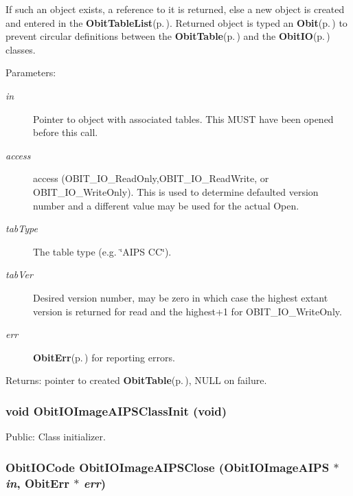 If such an object exists, a reference to it is returned, else a new object is created and entered in the {\bf Obit\-Table\-List}{\rm (p.\,\pageref{structObitTableList})}. Returned object is typed an {\bf Obit}{\rm (p.\,\pageref{structObit})} to prevent circular definitions between the {\bf Obit\-Table}{\rm (p.\,\pageref{structObitTable})} and the {\bf Obit\-IO}{\rm (p.\,\pageref{structObitIO})} classes. \begin{Desc}
\item[Parameters:]
\begin{description}
\item[{\em in}]Pointer to object with associated tables. This MUST have been opened before this call. \item[{\em access}]access (OBIT\_\-IO\_\-Read\-Only,OBIT\_\-IO\_\-Read\-Write, or OBIT\_\-IO\_\-Write\-Only). This is used to determine defaulted version number and a different value may be used for the actual Open. \item[{\em tab\-Type}]The table type (e.g. \char`\"{}AIPS CC\char`\"{}). \item[{\em tab\-Ver}]Desired version number, may be zero in which case the highest extant version is returned for read and the highest+1 for OBIT\_\-IO\_\-Write\-Only. \item[{\em err}]{\bf Obit\-Err}{\rm (p.\,\pageref{structObitErr})} for reporting errors. \end{description}
\end{Desc}
\begin{Desc}
\item[Returns:]pointer to created {\bf Obit\-Table}{\rm (p.\,\pageref{structObitTable})}, NULL on failure. \end{Desc}
\subsubsection{\setlength{\rightskip}{0pt plus 5cm}void Obit\-IOImage\-AIPSClass\-Init (void)}\label{ObitIOImageAIPS_8h_a3}


Public: Class initializer. 

\subsubsection{\setlength{\rightskip}{0pt plus 5cm}Obit\-IOCode Obit\-IOImage\-AIPSClose ({\bf Obit\-IOImage\-AIPS} $\ast$ {\em in}, {\bf Obit\-Err} $\ast$ {\em err})}\label{ObitIOImageAIPS_8h_a11}



